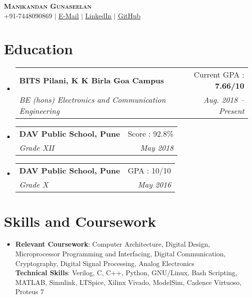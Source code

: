 \documentclass[a4paper,11pt]{article}
\makeatletter
\newcommand{\resumeSubheading}[4]{
  \vspace{-2pt}\item
    \begin{tabular*}{0.97\textwidth}[t]{l@{\extracolsep{\fill}}r}
      \textbf{#1} & #2 \\
      \textit{\small#3} & \textit{\small #4} \\
    \end{tabular*}\vspace{-7pt}
}
\newcommand{\resumeSubHeadingListStart}{\begin{itemize}[leftmargin=0.15in, label={}]}
\newcommand{\resumeSubHeadingListEnd}{\end{itemize}}
\makeatother
\begin{document}

\begin{center}
    \textbf{\Huge \scshape Manikandan Gunaseelan} \\ \vspace{1pt}
    \small +91-7448090869 $|$ \href{mailto:manikandang1729@gmail.com}{\underline{E-Mail}} $|$ 
    \href{https://linkedin.com/in/manikandan-gunaseelan}{\underline{LinkedIn}} $|$
    \href{https://github.com/manig1729}{\underline{GitHub}}
\end{center}


\section{Education}
  \resumeSubHeadingListStart
    \resumeSubheading
      {BITS Pilani, K K Birla Goa Campus}{Current GPA : \textbf{7.66/10}}
      {BE (hons) Electronics and Communication Engineering}{Aug. 2018 -- Present}
    \resumeSubheading
      {DAV Public School, Pune}{Score : 92.8\%}
      {Grade XII}{May 2018}
    \resumeSubheading
      {DAV Public School, Pune}{GPA : 10/10}
      {Grade X}{May 2016}
  \resumeSubHeadingListEnd

\section{Skills and Coursework}
 \begin{itemize}[leftmargin=0.15in, label={}]
    \item{
     \textbf{Relevant Coursework}{: Computer Architecture, Digital Design, Microprocessor Programming and Interfacing, Digital Communication, Cryptography, Digital Signal Processing, Analog Electronics} \\
     \vspace{1mm}
     \textbf{Technical Skills}{: Verilog, C, C++, Python,
GNU/Linux, Bash Scripting, MATLAB, Simulink, LTSpice, Xilinx Vivado, ModelSim, Cadence Virtuoso, Proteus 7} \\
    }
 \end{itemize}

\end{document}
